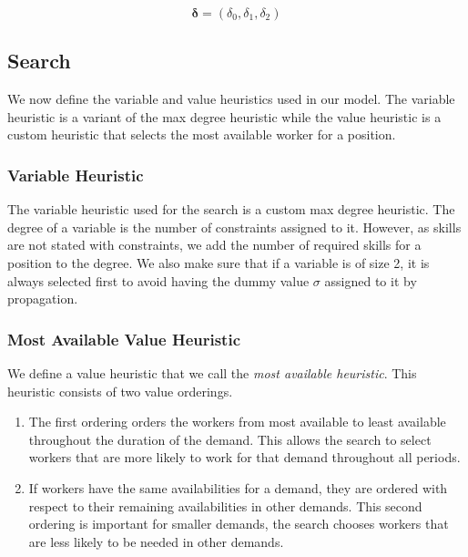 \documentclass[../../thesis.tex]{subfiles}
\begin{document}
\begin{equation}
  \label{penalties:cp}
  \bm{\delta} = (\delta_0, \delta_1, \delta_2)
\end{equation}




\subsection{Search}

We now define the variable and value heuristics used in our model. The variable heuristic is a variant of the 
max degree heuristic while the value heuristic is a custom heuristic that selects the most available worker for a position.

\subsubsection{Variable Heuristic}

The variable heuristic used for the search is a custom max degree heuristic. 
The degree of a variable is the number of constraints assigned to it. However, as skills are not stated with constraints, 
we add the number of required skills for a position to the degree. 
We also make sure that if a variable is of size 2, it is always selected first to avoid having the dummy value $\sigma$ assigned to it by 
propagation.


\subsubsection{Most Available Value Heuristic}

We define a value heuristic that we call the \emph{most available heuristic}. 
This heuristic consists of two value orderings.
\begin{enumerate}
  \item The first ordering orders the workers from most available to least available throughout the duration of the demand.
        This allows the search to select workers that are more likely to work for that demand throughout all periods.
  \item If workers have the same availabilities for a demand, they are ordered with respect to their remaining availabilities in other demands. This 
        second ordering is important for smaller demands, the search chooses workers that are less likely to be needed in other demands.
\end{enumerate}
\end{document}
